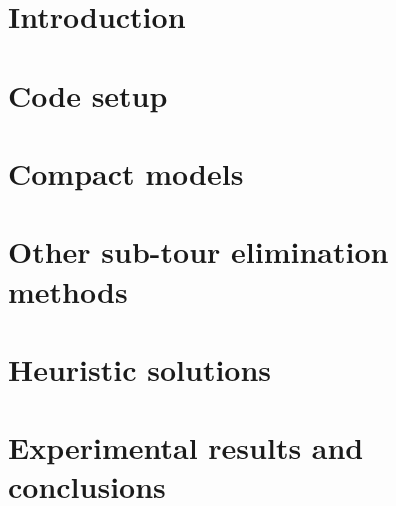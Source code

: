\thispagestyle{empty}

\tableofcontents %

\clearpage{\pagestyle{plain}\cleardoublepage}


\chapter{Introduction}
\label{chapter:primo_capitolo} 



\chapter{Code setup}
\label{chapter:code-setup}



\chapter{Compact models} 
\label{chapter:compact-models} 
 


\chapter{Other sub-tour elimination methods} 
\label{chapter:other-sec} 
 


\chapter{Heuristic solutions} 
\label{chapter:codice} 



\chapter{Experimental results and conclusions}
\label{chapter:results}


\clearpage{\pagestyle{plain}\cleardoublepage}


